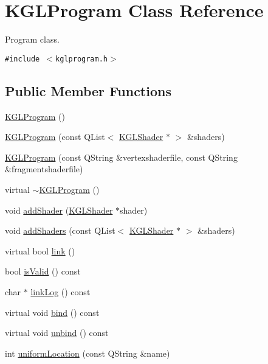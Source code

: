 \hypertarget{class_k_g_l_program}{
\section{KGLProgram Class Reference}
\label{class_k_g_l_program}
}
Program class.  


{\tt \#include $<$kglprogram.h$>$}

\subsection*{Public Member Functions}
\begin{CompactItemize}
\item 
\hyperlink{class_k_g_l_program_e252511a4efad9a198d44a0a69b0f43b}{KGLProgram} ()
\item 
\hyperlink{class_k_g_l_program_a72b7b0ac0efba795712e2e72e067127}{KGLProgram} (const QList$<$ \hyperlink{class_k_g_l_shader}{KGLShader} $\ast$ $>$ \&shaders)
\item 
\hyperlink{class_k_g_l_program_ed56f8e432d8e523deab848515b04bea}{KGLProgram} (const QString \&vertexshaderfile, const QString \&fragmentshaderfile)
\item 
virtual \hyperlink{class_k_g_l_program_2c90a7ed95bc53b2766e556c1ca996cb}{$\sim$KGLProgram} ()
\item 
void \hyperlink{class_k_g_l_program_cb58b41949d3a88b66557f43196dcaba}{addShader} (\hyperlink{class_k_g_l_shader}{KGLShader} $\ast$shader)
\item 
void \hyperlink{class_k_g_l_program_465ecaf07d2116b74bf892d40c7dc17a}{addShaders} (const QList$<$ \hyperlink{class_k_g_l_shader}{KGLShader} $\ast$ $>$ \&shaders)
\item 
virtual bool \hyperlink{class_k_g_l_program_906166edf1fc7332a5ff8d6c1c18469c}{link} ()
\item 
bool \hyperlink{class_k_g_l_program_5c1aeee12f117bcdb9617ef27c223918}{isValid} () const 
\item 
char $\ast$ \hyperlink{class_k_g_l_program_731506a0e8462aa48f576ab4c1d28fc9}{linkLog} () const 
\item 
virtual void \hyperlink{class_k_g_l_program_48756f0c04a768d2fef06d7ac3d29207}{bind} () const 
\item 
virtual void \hyperlink{class_k_g_l_program_a52890b41224848903a772049f374dc3}{unbind} () const 
\item 
int \hyperlink{class_k_g_l_program_51a6b83fc54f4364ae013068823a981d}{uniformLocation} (const QString \&name)

\end{CompactItemize}
